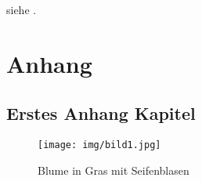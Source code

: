 \documentclass[11pt]{article}
\begin{document}



\tableofcontents
\newpage
\listoffigures
\newpage
\renewcommand*{\listoflistingscaption}{Listingverzeichnis}
\listoflistings
\newpage


siehe .

\printbibliography

\newpage

\appendix
\renewcommand{\thesubsection}{\Alph{subsection}}
\renewcommand{\thefigure}{\thesubsection.\arabic{figure}}


\section*{Anhang}
\subsection{Erstes Anhang Kapitel}
\setcounter{figure}{0}
\label{lab:erster_anhang}

\begin{figure}[H]
    \centering
    \texttt{[image: img/bild1.jpg]}
    \caption[Blume]{Blume in Gras mit Seifenblasen}
    \label{fig:anhang_blume}
\end{figure}



\newpage



%


\setcounter{secnumdepth}{0}

\end{document}
